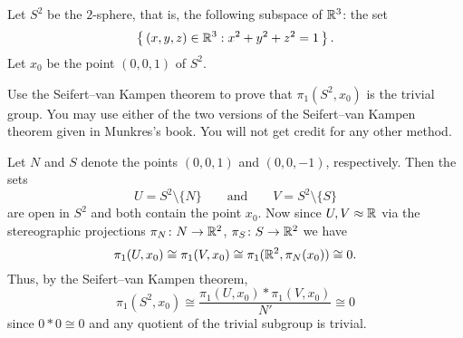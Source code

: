\begin{problem}
  Let $S^2$ be the $2$-sphere, that is, the following subspace of $\mathbb{R}^3$:
  the set
  \[
    \left\{\,(x,y,z)\in\mathbb{R}^3:x^2+y^2+z^2=1\,\right\}.
  \]
  Let $x_0$ be the point $(0,0,1)$ of $S^2$.


  Use the Seifert--van Kampen theorem to prove that $\pi_1(S^2,x_0)$ is the
  trivial group. You may use either of the two versions of the Seifert--van
  Kampen theorem given in Munkres's book. You will not get credit for any
  other method.
\end{problem}

\begin{solution}
  Let $N$ and $S$ denote the points $(0,0,1)$ and $(0,0,-1)$,
  respectively. Then the sets
  \[
    U=S^2\setminus\{N\}\qquad\text{and}\qquad V=S^2\setminus\{S\}
  \]
  are open in $S^2$ and both contain the point $x_0$. Now since
  $U,V\approx\mathbb{R}$ via the stereographic projections
  $\pi_N\colon N\to\mathbb{R}^2$, $\pi_S\colon S\to\mathbb{R}^2$ we have
  \[
    \pi_1(U,x_0)\cong\pi_1(V,x_0)\cong\pi_1(\mathbb{R}^2,\pi_N(x_0))\cong 0.
  \]
  Thus, by the Seifert--van Kampen theorem,
  \[
    \pi_1(S^2,x_0)\cong\frac{\pi_1(U,x_0)*\pi_1(V,x_0)}{N'}\cong 0
  \]
  since $0*0\cong 0$ and any quotient of the trivial subgroup is trivial.
\end{solution}

